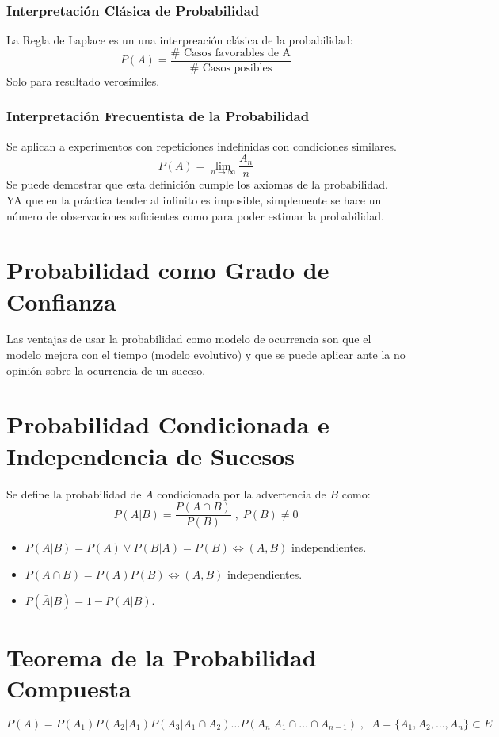 \documentclass[10pt,a4paper]{book}
\begin{document}
\subsubsection{Interpretación Clásica de Probabilidad}
La Regla de Laplace es un una interpreación clásica de la probabilidad:
\[P(A) = \frac{\#\text{ Casos favorables de A}}{\#\text{ Casos posibles}}\]
Solo para resultado verosímiles.
\subsubsection{Interpretación Frecuentista de la Probabilidad}
Se aplican a experimentos con repeticiones indefinidas con condiciones similares.
\[P(A) = \lim_{n\to\infty}\frac{A_n}{n}\]
Se puede demostrar que esta definición cumple los axiomas de la probabilidad. YA que en la práctica tender al infinito es imposible, simplemente se hace un número de observaciones suficientes como para poder estimar la probabilidad.

\section{Probabilidad como Grado de Confianza}
Las ventajas de usar la probabilidad como modelo de ocurrencia son que el modelo mejora con el tiempo (modelo evolutivo) y que se puede aplicar ante la no opinión sobre la ocurrencia de un suceso.

\section{Probabilidad Condicionada e Independencia de Sucesos}
Se define la probabilidad de $A$ condicionada por la advertencia de $B$ como:
\[P(A|B) = \frac{P(A\cap B)}{P(B)}\;,\;P(B)\neq 0\]
\begin{itemize}
	\item $P(A|B) = P(A) \lor P(B|A) = P(B)\iff(A,B)$ independientes.
	\item $P(A\cap B) = P(A)P(B) \iff (A,B)$ independientes.
	\item $P(\bar A|B) = 1-P(A|B)$.
\end{itemize}
\section{Teorema de la Probabilidad Compuesta}
\[P(A) = P(A_1)P(A_2|A_1)P(A_3|A_1\cap A_2)\dots P(A_n|A_1\cap\dots\cap A_{n-1})\;,\;\;A=\{A_1,A_2,\dots,A_n\}\subset E\]
\end{document}
